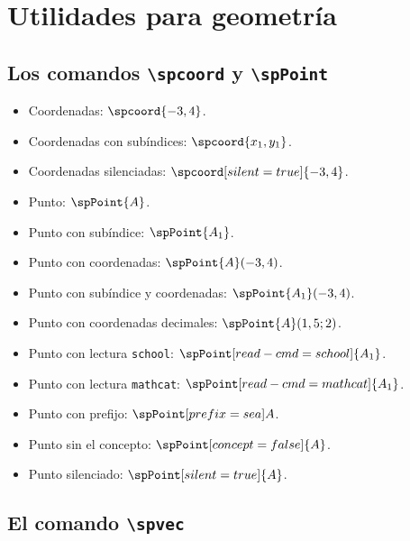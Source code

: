 \documentclass{article}
\begin{document}
\section*{Utilidades para geometría}

\subsection*{Los comandos \texttt{\textbackslash spcoord} y \texttt{\textbackslash spPoint}}

\begin{itemize}
  \item Coordenadas: $\spcoord{-3, 4}$.
  \item Coordenadas con subíndices: $\spcoord{x_{1},y_{1}}$.
  \item Coordenadas silenciadas: $\spcoord[silent=true]{-3, 4}$.
  \item Punto: $\spPoint{A}$.
  \item Punto con subíndice: $\spPoint{A_{1}}$.
  \item Punto con coordenadas: $\spPoint{A}(-3,4)$.
  \item Punto con subíndice y coordenadas: $\spPoint{A_{1}}(-3,4)$.
  \item Punto con coordenadas decimales: $\spPoint{A}(1,5;2)$.
  \item Punto con lectura \texttt{school}: $\spPoint[read-cmd=school]{A_{1}}$.
  \item Punto con lectura \texttt{mathcat}: $\spPoint[read-cmd=mathcat]{A_{1}}$.
  \item Punto con prefijo: $\spPoint[prefix={sea}]{A}$.
  \item Punto sin el concepto: $\spPoint[concept=false]{A}$.
  \item Punto silenciado: $\spPoint[silent=true]{A}$.
\end{itemize}

\subsection*{El comando \texttt{\textbackslash spvec}}
\end{document}
